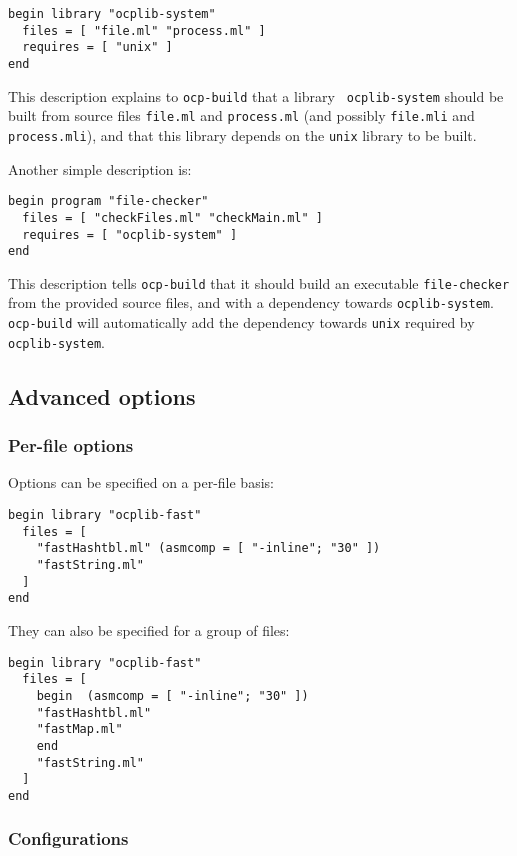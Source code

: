 \begin{verbatim}
begin library "ocplib-system"
  files = [ "file.ml" "process.ml" ]
  requires = [ "unix" ]
end
\end{verbatim}

This description explains to {\tt ocp-build} that a library {\tt
  ocplib-system} should be built from source files {\tt file.ml} and
{\tt process.ml} (and possibly {\tt file.mli} and {\tt process.mli}),
and that this library depends on the {\tt unix} library to be built.

Another simple description is:

\begin{verbatim}
begin program "file-checker"
  files = [ "checkFiles.ml" "checkMain.ml" ]
  requires = [ "ocplib-system" ]
end
\end{verbatim}

This description tells {\tt ocp-build} that it should build an
executable {\tt file-checker} from the provided source files, and with
a dependency towards {\tt ocplib-system}. {\tt ocp-build} will
automatically add the dependency towards {\tt unix} required by {\tt
  ocplib-system}.

\subsection{Advanced options}

\subsubsection{Per-file options}

Options can be specified on a per-file basis:

\begin{verbatim}
begin library "ocplib-fast"
  files = [
    "fastHashtbl.ml" (asmcomp = [ "-inline"; "30" ])
    "fastString.ml"
  ]
end
\end{verbatim}

They can also be specified for a group of files:

\begin{verbatim}
begin library "ocplib-fast"
  files = [
    begin  (asmcomp = [ "-inline"; "30" ])
    "fastHashtbl.ml"
    "fastMap.ml"
    end
    "fastString.ml"
  ]
end
\end{verbatim}

\subsubsection{Configurations}

